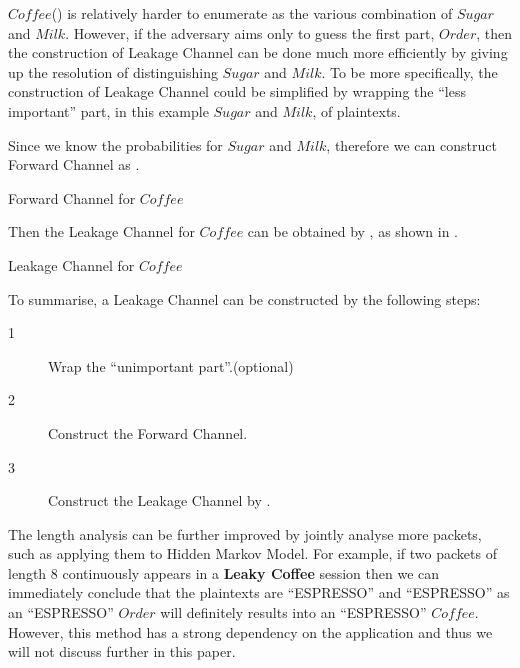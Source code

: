 \begin{example} \label{Ex: Single-OrderFlavour}
$Coffee$() is relatively harder to enumerate as the various combination of $Sugar$ and $Milk$. However, if the adversary aims only to guess the first part, $Order$, then the construction of Leakage Channel can be done much more efficiently by giving up the resolution of distinguishing $Sugar$ and $Milk$. To be more specifically, the construction of Leakage Channel could be simplified by wrapping the “less important” part, in this example $Sugar$ and $Milk$, of plaintexts.

Since we know the probabilities for $Sugar$ and $Milk$, therefore we can construct Forward Channel as .

\begin{table}[H]
\centering
\resizebox{\textwidth}{!}{
{}
}
\caption{Forward Channel for $Coffee$}
\label{Tbl: Forward Channel for Coffee}
\end{table}

Then the Leakage Channel for $Coffee$ can be obtained by , as shown in .
\begin{table}[H]
\centering
{}
\caption{Leakage Channel for $Coffee$}
\label{Tbl: Leakage Channel for Coffee}
\end{table}
\end{example}

To summarise, a Leakage Channel can be constructed by the following steps:
\begin{description}
\item[1] Wrap the “unimportant part”.(optional)
\item[2] Construct the Forward Channel.
\item[3] Construct the Leakage Channel by .
\end{description}

The length analysis can be further improved by jointly analyse more packets, such as applying them to Hidden Markov Model. For example, if two packets of length $8$ continuously appears in a \textbf{Leaky Coffee} session then we can immediately conclude that the plaintexts are “ESPRESSO” and “ESPRESSO” as an “ESPRESSO” $Order$ will definitely results into an “ESPRESSO” $Coffee$. However, this method has a strong dependency on the application and thus we will not discuss further in this paper.

